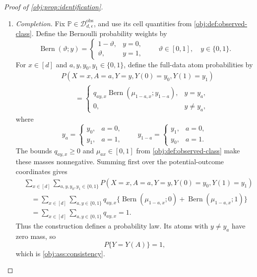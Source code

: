 \begin{proof}[Proof of \cref{obj:prop:identification}]
\begin{enumerate}
\item \emph{Completion.}
Fix \(\mathbb P\in\mathcal D_{d,\epsilon}^{\mathrm{obs}}\), and use its cell quantities from \cref{obj:def:observed-class}. Define the Bernoulli probability weights by
\[
\operatorname{Bern}(\vartheta;y)
=
\begin{cases}
1-\vartheta,&y=0,\\
\vartheta,&y=1,
\end{cases}
\qquad
\vartheta\in[0,1],\quad y\in\{0,1\}.
\]
For \(x\in[d]\) and \(a,y,y_0,y_1\in\{0,1\}\), define the full-data atom probabilities by
\[
\begin{aligned}
&P(X=x,A=a,Y=y,Y(0)=y_0,Y(1)=y_1)\\
&\qquad=
\begin{cases}
q_{ay,x}\operatorname{Bern}(\mu_{1-a,x};y_{1-a}),&y=y_a,\\
0,&y\ne y_a,
\end{cases}
\end{aligned}
\]
where
\[
y_a=
\begin{cases}
y_0,&a=0,\\
y_1,&a=1,
\end{cases}
\qquad
y_{1-a}=
\begin{cases}
y_1,&a=0,\\
y_0,&a=1.
\end{cases}
\]
The bounds \(q_{ay,x}\ge0\) and \(\mu_{ax}\in[0,1]\) from \cref{obj:def:observed-class} make these masses nonnegative. Summing first over the potential-outcome coordinates gives
\[
\begin{aligned}
&\sum_{x\in[d]}\sum_{a,y,y_0,y_1\in\{0,1\}}
P(X=x,A=a,Y=y,Y(0)=y_0,Y(1)=y_1)\\
&\quad=
\sum_{x\in[d]}\sum_{a,y\in\{0,1\}}
q_{ay,x}
\bigl\{
\operatorname{Bern}(\mu_{1-a,x};0)
+\operatorname{Bern}(\mu_{1-a,x};1)
\bigr\}\\
&\quad=\sum_{x\in[d]}\sum_{a,y\in\{0,1\}}q_{ay,x}=1.
\end{aligned}
\]
Thus the construction defines a probability law. Its atoms with \(y\ne y_a\) have zero mass, so
\[
P\{Y=Y(A)\}=1,
\]
which is \cref{obj:ass:consistency}.


\end{enumerate}
\end{proof}

